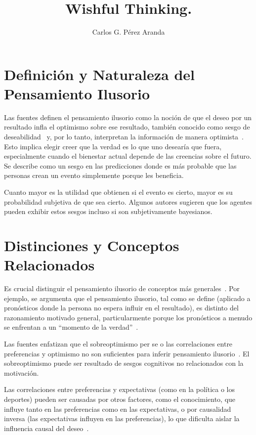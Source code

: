 \documentclass[12pt, a4paper, twoside]{article}
\title{Wishful Thinking.}
\author{Carlos G. Pérez Aranda}
\begin{document}
\maketitle
\newpage
\section{Definición y Naturaleza del Pensamiento Ilusorio}
Las fuentes definen el pensamiento ilusorio como la noción de que el deseo por un resultado infla el optimismo sobre ese resultado, 
también conocido como sesgo de deseabilidad~\cite{krizan2009wishful} y, por lo tanto, interpretan la información de manera optimista~\cite{caplin2019wishful}. 
Esto implica elegir creer que la verdad es lo que uno desearía que fuera, especialmente cuando el bienestar actual depende de las creencias sobre el futuro. 
Se describe como un sesgo en las predicciones donde es más probable que las personas crean un evento simplemente porque les beneficia. 

Cuanto mayor es la 
utilidad que obtienen si el evento es cierto, mayor es su probabilidad subjetiva de que sea cierto. Algunos autores sugieren que los agentes pueden exhibir 
estos sesgos incluso si son subjetivamente bayesianos.

\section{Distinciones y Conceptos Relacionados}
Es crucial distinguir el pensamiento ilusorio de conceptos más generales~\cite{krizan2009wishful}. Por ejemplo, se argumenta que el pensamiento ilusorio, 
tal como se define (aplicado a pronósticos donde la persona no espera influir en el resultado), es distinto del razonamiento motivado general, particularmente porque 
los pronósticos a menudo se enfrentan a un ``momento de la verdad''~\cite{krizan2009wishful}.

Las fuentes enfatizan que el sobreoptimismo per se o las correlaciones entre preferencias y optimismo no son suficientes para inferir pensamiento ilusorio~\cite{krizan2009wishful}.
El sobreoptimismo puede ser resultado de sesgos cognitivos no relacionados con la motivación. 

Las correlaciones entre preferencias y expectativas (como en la política o los deportes) pueden ser causadas por otros factores, como el conocimiento, 
que influye tanto en las preferencias como en las expectativas, o por causalidad inversa (las expectativas influyen en las preferencias), lo que dificulta 
aislar la influencia causal del deseo~\cite{krizan2009wishful}.
\end{document}
